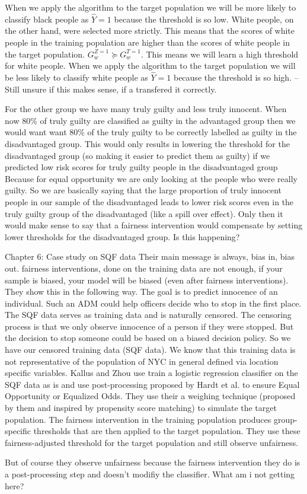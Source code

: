 When we apply the algorithm to the target population we will be more likely to classify black people as $\hat{Y} = 1$ because the threshold is so low. White people, on the other hand,
were selected more strictly. This means that the scores of white people in the training population are higher than the scores of white people in the target population.
$G_w^{Z=1} \succeq G_w^{T=1}$. This means we will learn a high threshold for white people. When we apply the algorithm to the target population we will be less likely to classify white
people as $\hat{Y} = 1$ because the threshold is so high. -- Still unsure if this makes sense, if a transfered it correctly.

For the other group we have many truly guilty and less truly innocent. When now 80\% of truly guilty are classified as guilty in the advantaged group then we would want want 80\% of
the truly guilty to be correctly labelled as guilty in the disadvantaged group. This would only results in lowering the threshold for the disadvantaged group
(so making it easier to predict them as guilty) if we predicted low risk scores for truly guilty people in the disadvantaged group
 Because for equal opportunity we are only looking at the people who were really guilty. So we are basically saying that the large proportion of truly
 innocent people in our sample of the disadvantaged leads to lower risk scores even in the truly guilty group of the disadvantaged (like a spill over effect).
 Only then it would make sense to say that a fairness intervention would compensate by setting lower thresholds for the disadvantaged group. Is this happening? 

Chapter 6: Case study on SQF data
Their main message is always, bias in, bias out. fairness interventions, done on the training data are not enough, if your sample is biased, your model will be biased (even after fairness interventions).
They show this in the following way. The goal is to predict innocence of an individual. Such an ADM could help officers
decide who to stop in the first place. The SQF data serves as training data and is naturally censored. The censoring process is that we only
observe innocence of a person if they were stopped. But the decision to stop someone could be based on a biased decision policy.
So we have our censored training data (SQF data). We know that this training data is not representative of the population of NYC in general defined via
location specific variables. Kallus and Zhou use train a logistic regression classifier on the SQF data as is and use post-processing proposed
by Hardt et al. to ensure Equal Opportunity or Equalized Odds. They use their a weighing technique (proposed by them and inspired by propensity score matching)
to simulate the target population. The fairness intervention in the training population produces group-specific thresholds that are then applied to the target population.
They use these fairness-adjusted threshold for the target population and still observe unfairness.

But of course they observe unfairness because the fairness intervention they do is a post-processing step and doesn't modifiy the classifier. What am i not getting here?